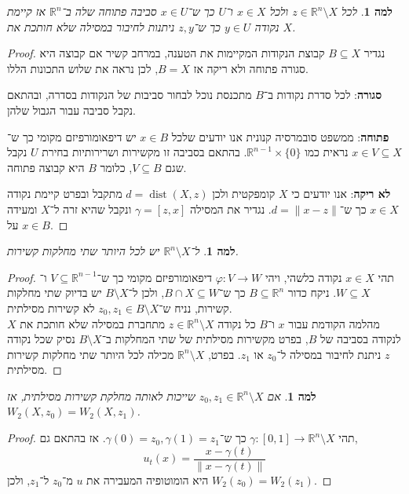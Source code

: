 \documentclass[aspectratio=169,notheorems,mathserif]{beamer}
\DeclareMathOperator\dist{dist}
\newcommand{\RR}[0]{\mathbb{R}}
\theoremstyle{c_plain}
\newtheorem{lemma}[theorem]{למה}
\theoremstyle{c_definition}
\theoremstyle{c_remark}
\begin{document}
\begin{frame}
	\begin{lemma}
		לכל $z \in \RR^n \setminus X$ ולכל $x \in X$ ו־$U$ כך ש־$x \in U$ סביבה פתוחה שלה ב־$\RR^n$ אז קיימת נקודה $y \in U$ כך ש־$z, y$ ניתנות לחיבור במסילה שלא חותכת את $X$.
	\end{lemma}
	\begin{proof}
		נגדיר $B \subseteq X$ קבוצת הנקודות המקיימות את הטענה, במרחב קשיר אם קבוצה היא סגורה פתוחה ולא ריקה אז $B = X$, לכן נראה את שלוש התכונות הללו.

		\textbf{סגורה}:
		לכל סדרת נקודות ב־$B$ מתכנסת נוכל לבחור סביבות של הנקודות בסדרה, ובהתאם נקבל סביבה עבור הגבול שלהן.

		\textbf{פתוחה}:
		ממשפט סובמרסיה קנונית אנו יודעים שלכל $x \in B$ יש דיפאומורפיזם מקומי כך ש־$x \in V \subseteq X$ נראית כמו $\RR^{n - 1} \times \{ 0 \}$.
		בהתאם בסביבה זו מקשירות ושרירותיות בחירת $U$ נקבל שגם $V \subseteq B$, כלומר $B$ היא קבוצה פתוחה.

		\textbf{לא ריקה}:
		אנו יודעים כי $X$ קומפקטית ולכן $d = \dist(X, z)$ מתקבל ובפרט קיימת נקודה $x \in X$ כך ש־$d = \lVert x - z \rVert$.
		נגדיר את המסילה $\gamma = [z, x]$ ונקבל שהיא זרה ל־$X$ ומעידה על $x \in B$.
	\end{proof}
\end{frame}
\begin{frame}
	\begin{lemma}\label{at_most_two_connected_components_lemma}
		ל־$\RR^n \setminus X$ יש לכל היותר שתי מחלקות קשירות.
	\end{lemma}
	\begin{proof}
		תהי $x \in X$ נקודה כלשהי, ויהי $\varphi : V \to W$ דיפאומורפיזם מקומי כך ש־$V \subseteq \RR^{n - 1}$ ו־$W \subseteq X$.
		ניקח כדור $B \subseteq \RR^n$ כך ש־$B \cap X \subseteq W$, ולכן ל־$B \setminus X$ יש בדיוק שתי מחלקות קשירות, נניח ש־$z_0, z_1 \in B \setminus X$ לא קשירות מסילתית. \\
		מהלמה הקודמת עבור $x$ ו־$B$ כל נקודה $z \in \RR^n \setminus X$ מתחברת במסילה שלא חותכת את $X$ לנקודה בסביבה של $B$, בפרט מקשירות מסילתית של שתי המחלקות ב־$B \setminus X$ נסיק שכל נקודה $z$ ניתנת לחיבור במסילה ל־$z_0$ או $z_1$.
		בפרט, $\RR^n \setminus X$ מכילה לכל היותר שתי מחלקות קשירות מסילתית.
	\end{proof}
\end{frame}
\begin{frame}
	\begin{lemma}\label{same_connected_component_implies_same_winding_lemma}
		אם $z_0, z_1 \in \RR^n \setminus X$ שייכות לאותה מחלקת קשירות מסילתית, אז $W_2(X, z_0) = W_2(X, z_1)$.
	\end{lemma}
	\begin{proof}
		תהי $\gamma : [0, 1] \to \RR^n \setminus X$ כך ש־$\gamma(0) = z_0, \gamma(1) = z_1$.
		אז בהתאם גם,
		\[
			u_t(x)
			= \frac{x - \gamma(t)}{\lVert x - \gamma(t) \rVert}
		\]
		היא הומוטופיה המעבירה את $u$ מ־$z_0$ ל־$z_1$, ולכן $W_2(z_0) = W_2(z_1)$.
	\end{proof}
\end{frame}
\end{document}
